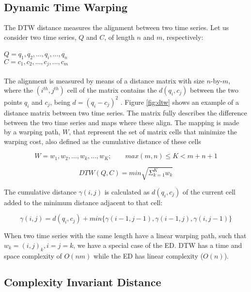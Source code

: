 \subsection{Dynamic Time Warping}
\label{subsec:dtw}

The DTW distance measures the alignment between two time series. Let us consider two time series, $Q$ and $C$, of length $n$ and $m$, respectively:\\
\\
$Q = q_1, q_2, ..., q_i, ..., q_n$\\
$C = c_1, c_2, ..., c_j, ..., c_m$\\
\\
The alignment is measured by means of a distance matrix with size $n$-by-$m$, where the $(i^{th},j^{th})$ cell of the matrix contains the $d(q_i, c_j)$ between the two points $q_i$ and $c_j$, being $d=(q_i - c_j)^2$ \cite{dtw}. Figure \ref{fig:dtw} shows an example of a distance matrix between two time series. The matrix fully describes the difference between the two time series and maps where these align. The mapping is made by a warping path, $W$, that represent the set of matrix cells that minimize the warping cost, also defined as the cumulative distance of these cells \cite{dtw}

\begin{equation}
W = w_1, w_2, ..., w_k, ..., w_K; \quad \quad max(m,n) \leq K < m+n+1
\end{equation} 

\begin{equation}
DTW(Q,C) = min \sqrt{\Sigma^K_{k=1} w_k}
\end{equation} 

The cumulative distance $\gamma(i,j)$ is calculated as $d(q_i,c_j)$ of the current cell added to the minimum distance adjacent to that cell:

\begin{equation}
\gamma(i,j) = d(q_i,c_j)+min\{\gamma(i-1,j-1), \gamma(i-1, j), \gamma(i, j-1)\}
\end{equation} 

When two time series with the same length have a linear warping path, such that $w_k=(i,j)_k, i=j=k$, we have a special case of the ED. DTW has a time and space complexity of $O(nm)$ while the ED has linear complexity ($O(n)$).

\subsection{Complexity Invariant Distance}
\label{subsec:complexity}

